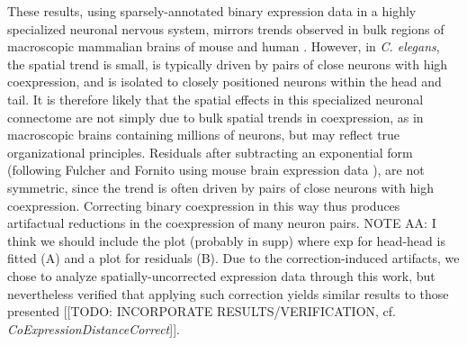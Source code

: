\documentclass[10pt,letterpaper]{article}
\begin{document}
These results, using sparsely-annotated binary expression data in a highly specialized neuronal nervous system, mirrors trends observed in bulk regions of macroscopic mammalian brains of mouse \cite{Fulcher:2016ck} and human \cite{Krienen:2016eq}.
However, in \emph{C. elegans}, the spatial trend is small, is typically driven by pairs of close neurons with high coexpression, and is isolated to closely positioned neurons within the head and tail.
It is therefore likely that the spatial effects in this specialized neuronal connectome are not simply due to bulk spatial trends in coexpression, as in macroscopic brains containing millions of neurons, but may reflect true organizational principles.
Residuals after subtracting an exponential form (following Fulcher and Fornito using mouse brain expression data \cite{Fulcher:2016ck}), are not symmetric, since the trend is often driven by pairs of close neurons with high coexpression.
Correcting binary coexpression in this way thus produces artifactual reductions in the coexpression of many neuron pairs.
NOTE AA: I think we should include the plot (probably in supp) where exp for head-head is fitted (A) and a plot for residuals (B).
Due to the correction-induced artifacts, we chose to analyze spatially-uncorrected expression data through this work, but nevertheless verified that applying such correction yields similar results to those presented [[TODO: INCORPORATE RESULTS/VERIFICATION, cf. \emph{CoExpressionDistanceCorrect}]].
\end{document}

